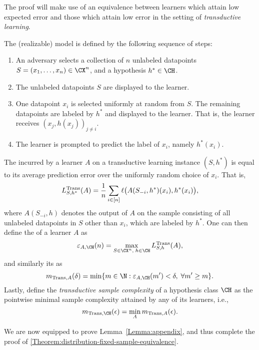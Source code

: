 \documentclass[11pt]{article}
\begin{document}
The proof will make use of an equivalence between learners which attain low expected error and those which attain low error in the setting of \emph{transductive learning}. 

\begin{definition}
The (realizable)  model is defined by the following sequence of steps: 
\begin{enumerate}
    \item An adversary selects a collection of $n$ unlabeled datapoints $S = (x_1, \ldots, x_n) \in \CX^n$, and a hypothesis $h^* \in \CH$. 
    \item The unlabeled datapoints $S$ are displayed to the learner. 
    \item One datapoint $x_i$ is selected uniformly at random from $S$. The remaining datapoints are labeled by $h^*$ and displayed to the learner. That is, the learner receives $(x_j, h(x_j))_{j \neq i}$. 
    \item The learner is prompted to predict the label of $x_i$, namely $h^*(x_i)$. 
\end{enumerate}
\end{definition}
The  incurred by a learner $A$ on a transductive learning instance $(S, h^*)$ is equal to its average prediction error over the uniformly random choice of $x_i$. That is, 
\[ L_{S, h^*}^{\operatorname{Trans}} (A) = \frac{1}{n} \sum_{i \in [n]} \ell \big( A(S_{-i}, h^*)(x_i), h^*(x_i) \big), \] 
where $A(S_{-i}, h)$ denotes the output of $A$ on the sample consisting of all unlabeled datapoints in $S$ other than $x_i$, which are labeled by $h^*$. One can then define the  of a learner $A$ as 
\[ \varepsilon_{A, \CH}(n) = \max_{S \in \CX^n, \; h \in \CH} L_{S, h}^{\Trans}(A), \] 
and similarly its  as 
\[ m_{\Trans, A}(\delta) = \min \{ m \in \N : \varepsilon_{A, \CH}(m') < \delta, \; \forall m' \geq m\}. \] 
Lastly, define the \emph{transductive sample complexity} of a hypothesis class $\CH$ as the pointwise minimal sample complexity attained by any of its learners, i.e., 
\[ m_{\Trans, \CH}(\epsilon) = \min_A m_{\Trans, A}(\epsilon). \]

\noindent We are now equipped to prove Lemma~\ref{Lemma:appendix}, and thus complete the proof of \cref{Theorem:distribution-fixed-sample-equivalence}. 
\end{document}
